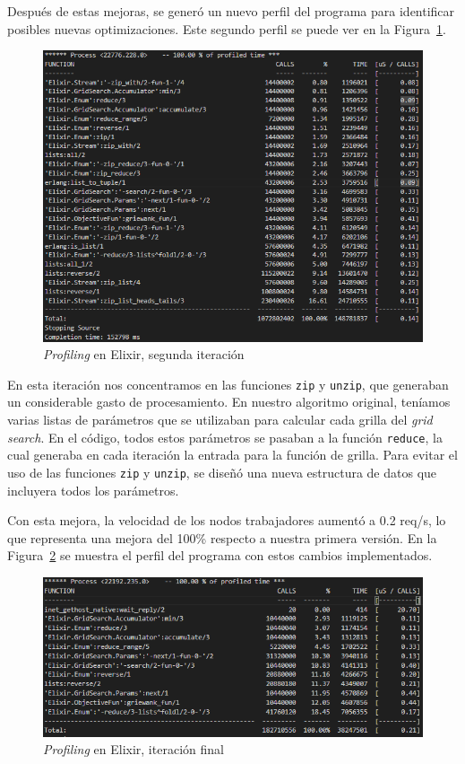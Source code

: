 \documentclass[11pt]{article}
\newcommand{\english}[1]{\textit{#1}}
\begin{document}
Después de estas mejoras, se generó un nuevo perfil del programa para identificar posibles nuevas optimizaciones. Este segundo perfil se puede ver en la Figura~\ref{fig:elx:profiling_2}.

\begin{figure}[ht]
    \centering
    \includegraphics[scale=0.4]{resources/distributed_systems/elixir/2.png}
    \caption{\english{Profiling} en Elixir, segunda iteración}
    \label{fig:elx:profiling_2}
\end{figure}

En esta iteración nos concentramos en las funciones \lstinline{zip} y \lstinline{unzip}, que generaban un considerable gasto de procesamiento. En nuestro algoritmo original, teníamos varias listas de parámetros que se utilizaban para calcular cada grilla del \textit{grid search}. En el código, todos estos parámetros se pasaban a la función \lstinline{reduce}, la cual generaba en cada iteración la entrada para la función de grilla. Para evitar el uso de las funciones \lstinline{zip} y \lstinline{unzip}, se diseñó una nueva estructura de datos que incluyera todos los parámetros.

Con esta mejora, la velocidad de los nodos trabajadores aumentó a 0.2 req/s, lo que representa una mejora del 100\% respecto a nuestra primera versión. En la Figura~\ref{fig:elx:profiling_3} se muestra el perfil del programa con estos cambios implementados.

\begin{figure}[ht]
    \centering
    \includegraphics[scale=0.4]{resources/distributed_systems/elixir/3.png}
    \caption{\english{Profiling} en Elixir, iteración final}
    \label{fig:elx:profiling_3}
\end{figure}
\end{document}
